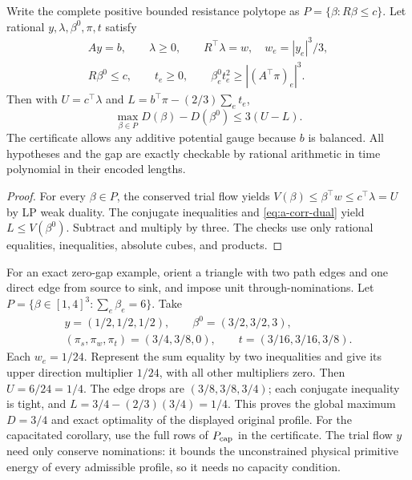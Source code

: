 \begin{proposition}
\label{prop:a-corr-certificate}
Write the complete positive bounded resistance polytope as
$P=\{\beta:R\beta\le c\}$. Let rational $y,\lambda,\beta^0,\pi,t$ satisfy
\[
 \begin{gathered}
 Ay=b,\qquad \lambda\ge0,\qquad
 R^\top\lambda=w,\quad w_e=|y_e|^3/3,\\
 R\beta^0\le c,\qquad t_e\ge0,\qquad
 \beta_e^0t_e^2\ge|(A^\top\pi)_e|^3.
 \end{gathered}
\]
Then with $U=c^\top\lambda$ and
$L=b^\top\pi-(2/3)\sum_e t_e$,
\begin{equation}
 \max_{\beta\in P}D(\beta)-D(\beta^0)\le3(U-L).
 \label{eq:a-corr-certificate-gap}
\end{equation}
The certificate allows any additive potential gauge because $b$ is balanced.
All hypotheses and the gap are exactly checkable by rational arithmetic
in time polynomial in their encoded lengths.
\end{proposition}
\begin{proof}
For every $\beta\in P$, the conserved trial flow yields
$V(\beta)\le\beta^\top w\le c^\top\lambda=U$ by LP weak duality.
The conjugate inequalities and \cref{eq:a-corr-dual} yield
$L\le V(\beta^0)$. Subtract and multiply by three. The checks use only
rational equalities, inequalities, absolute cubes, and products.
\end{proof}

For an exact zero-gap example, orient a triangle with two path edges and
one direct edge from source to sink, and impose unit through-nominations.
Let $P=\{\beta\in[1,4]^3:\sum_e\beta_e=6\}$. Take
\[
 \begin{gathered}
 y=(1/2,1/2,1/2),\qquad \beta^0=(3/2,3/2,3),\\
 (\pi_s,\pi_w,\pi_t)=(3/4,3/8,0),\qquad
 t=(3/16,3/16,3/8).
 \end{gathered}
\]
Each $w_e=1/24$. Represent the sum equality by two inequalities and give
its upper direction multiplier $1/24$, with all other multipliers zero.
Then $U=6/24=1/4$. The edge drops are $(3/8,3/8,3/4)$; each conjugate
inequality is tight, and $L=3/4-(2/3)(3/4)=1/4$. This proves the global
maximum $D=3/4$ and exact optimality of the displayed original profile.
For the capacitated corollary, use the full rows of $P_{\rm cap}$ in the
certificate. The trial flow $y$ need only conserve nominations: it bounds
the unconstrained physical primitive energy of every admissible profile,
so it needs no capacity condition.

